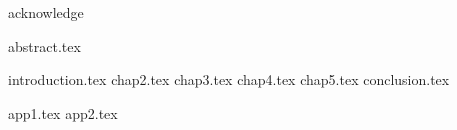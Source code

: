 \documentclass[UTF8, nocolorlinks, openany, spacing, pdftoc, pkuspace]{pkuthss}
\begin{document}
	\covermatter
 	
 	\null\newpage
 	
 	\null\newpage

	
	
	{acknowledge}
	
	\frontmatter
	{abstract.tex}
	\tableofcontents

	\mainmatter
	{introduction.tex}
	{chap2.tex}
	{chap3.tex}
	{chap4.tex}
	{chap5.tex}
	{conclusion.tex}
	
	\appendix
	\printbibliography[
		heading = bibintoc,
		sorting = ecnty
	]
	{app1.tex}
	{app2.tex}
	
	\backmatter
	
\end{document}
